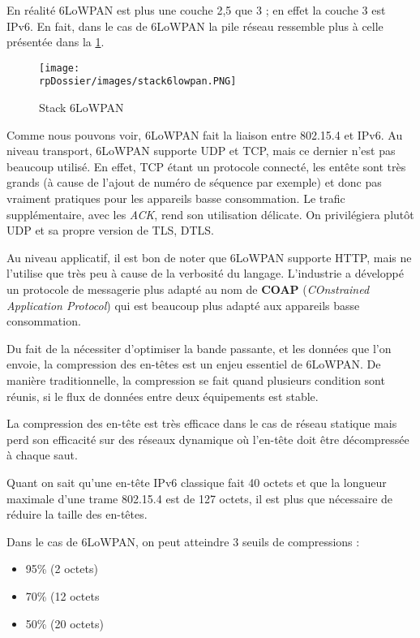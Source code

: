 En réalité 6LoWPAN est plus une couche 2,5 que 3 ; en effet la couche 3 est IPv6. En fait, dans le cas de 6LoWPAN la pile réseau ressemble plus à celle présentée dans la \cref{stack6lowpan}.

\begin{figure}[H]
\centering
\texttt{[image: \\rpDossier/images/stack6lowpan.PNG]}
\caption{Stack 6LoWPAN}
\label{stack6lowpan}
\end{figure}

Comme nous pouvons voir, 6LoWPAN fait la liaison entre 802.15.4 et IPv6. Au niveau transport, 6LoWPAN supporte UDP et TCP, mais ce dernier n'est pas beaucoup utilisé. En effet, TCP étant un protocole connecté, les entête sont très grands (à cause de l'ajout de numéro de séquence par exemple) et donc pas vraiment pratiques pour les appareils basse consommation. Le trafic supplémentaire, avec les \textit{ACK}, rend son utilisation délicate. On privilégiera plutôt UDP et sa propre version de TLS, DTLS. 

Au niveau applicatif, il est bon de noter que 6LoWPAN supporte HTTP, mais ne l'utilise que très peu à cause de la verbosité du langage. L'industrie a développé un protocole de messagerie plus adapté au nom de \textbf{COAP} (\textit{COnstrained Application Protocol}) qui est beaucoup plus adapté aux appareils basse consommation.

Du fait de la nécessiter d'optimiser la bande passante, et les données que l'on envoie, la compression des en-têtes est un enjeu essentiel de 6LoWPAN. De manière traditionnelle, la compression se fait quand plusieurs condition sont réunis, si le flux de données entre deux équipements est stable.

La compression des en-tête est très efficace dans le cas de réseau statique mais perd son efficacité sur des réseaux dynamique où l'en-tête doit être décompressée à chaque saut.

Quant on sait qu'une en-tête IPv6 classique fait 40 octets et que la longueur maximale d'une trame 802.15.4 est de 127 octets, il est plus que nécessaire de réduire la taille des en-têtes.

Dans le cas de 6LoWPAN, on peut atteindre 3 seuils de compressions :
\begin{itemize}
\item 95\% (2 octets)
\item 70\% (12 octets
\item 50\% (20 octets)
\end{itemize}

